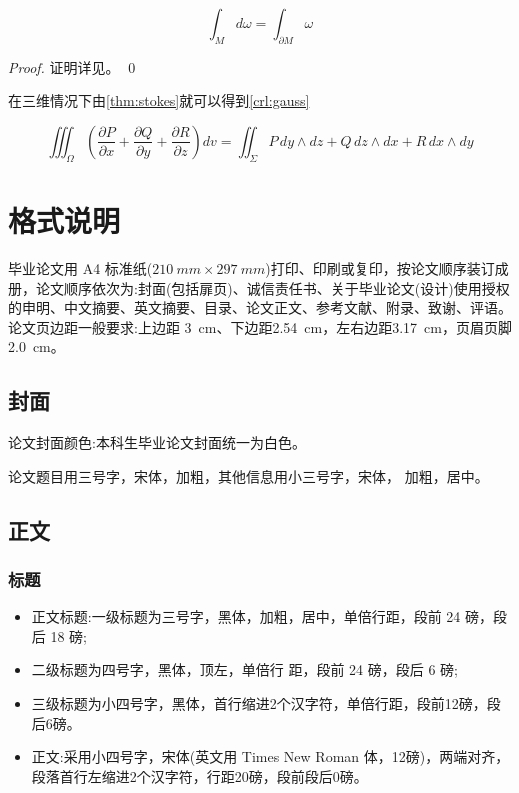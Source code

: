 \documentclass{LZU}
\begin{document}
\begin{theorem}[斯托克斯公式]
    \begin{equation}
        \int_M d\omega = \int_{\partial M} \omega
    \end{equation}
    \label{thm:stokes}
\end{theorem}
\begin{proof}
    证明详见\supercite{stokes}。
    \qed
\end{proof}
在三维情况下由\cref{thm:stokes}就可以得到\cref{crl:gauss}
\begin{corollary}[高斯公式]
    \[\iiint_{\Omega}\left(\frac{\partial P}{\partial x}+\frac{\partial Q}{\partial y}+\frac{\partial R}{\partial z}\right)dv=\iint_{\Sigma}P\,dy\wedge dz+Q\,dz\wedge dx+R\,dx\wedge dy\]
    \label{crl:gauss}
\end{corollary}



\chapter{格式说明}
\label{chp:format}
毕业论文用 A4 标准纸($\SI{210}{mm}\times \SI{297}{mm}$)打印、印刷或复印，按论文顺序装订成册，论文顺序依次为:封面(包括扉页)、诚信责任书、关于毕业论文(设计)使用授权的申明、中文摘要、英文摘要、目录、论文正文、参考文献、附录、致谢、评语。论文页边距一般要求:上边距 \SI{3}{cm}、下边距\SI{2.54}{cm}，左右边距\SI{3.17}{cm}，页眉页脚\SI{2.0}{cm}。
\section{封面}
论文封面颜色:本科生毕业论文封面统一为白色。

论文题目用三号字，宋体，加粗，其他信息用小三号字，宋体， 加粗，居中。
\section{正文}
\subsection{标题}
\begin{itemize}
    \item 正文标题:一级标题为三号字，黑体，加粗，居中，单倍行距，段前 24 磅，段后 18 磅;
    \item 二级标题为四号字，黑体，顶左，单倍行 距，段前 24 磅，段后 6 磅;
    \item 三级标题为小四号字，黑体，首行缩进2个汉字符，单倍行距，段前12磅，段后6磅。
    \item 正文:采用小四号字，宋体(英文用 Times New Roman 体，12磅)，两端对齐，段落首行左缩进2个汉字符，行距20磅，段前段后0磅。
\end{itemize}
\end{document}
